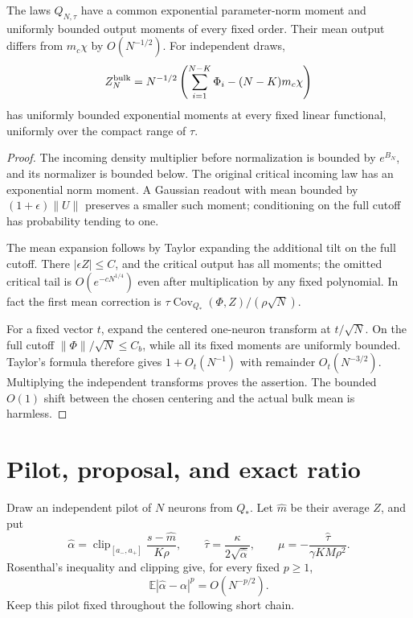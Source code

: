 \documentclass[11pt]{article}
\newcommand{\E}{\mathbb E}\newcommand{\R}{\mathbb R}
\begin{document}
\begin{lemma}\label{lem:moments}
The laws $Q_{N,\tau}$ have a common exponential parameter-norm moment
and uniformly bounded output moments of every fixed order. Their mean
output differs from $m_c\chi$ by $O(N^{-1/2})$. For independent draws,
\[
 Z_N^{\rm bulk}=N^{-1/2}\left(\sum_{i=1}^{N-K}\Phi_i-(N-K)m_c\chi\right)
\]
has uniformly bounded exponential moments at every fixed linear
functional, uniformly over the compact range of $\tau$.
\end{lemma}
\begin{proof}
The incoming density multiplier before normalization is bounded by
$e^{B_N}$, and its normalizer is bounded below. The original critical
incoming law has an exponential norm moment. A Gaussian readout with
mean bounded by $(1+\epsilon)\|U\|$ preserves a smaller such moment;
conditioning on the full cutoff has probability tending to one.

The mean expansion follows by Taylor expanding the additional tilt
on the full cutoff. There $|\epsilon Z|\le C$, and the critical output
has all moments; the omitted critical tail is $O(e^{-cN^{1/4}})$ even
after multiplication by any fixed polynomial. In fact the first mean
correction is
$\tau\operatorname{Cov}_{Q_*}(\Phi,Z)/(\rho\sqrt N)$.

For a fixed vector $t$, expand the centered one-neuron transform at
$t/\sqrt N$. On the full cutoff $\|\Phi\|/\sqrt N\le C_b$, while
all its fixed moments are uniformly bounded. Taylor's formula therefore
gives $1+O_t(N^{-1})$ with remainder $O_t(N^{-3/2})$. Multiplying the
independent transforms proves the assertion. The bounded $O(1)$ shift
between the chosen centering and the actual bulk mean is harmless.
\end{proof}

\section{Pilot, proposal, and exact ratio}
Draw an independent pilot of $N$ neurons from $Q_*$. Let $\widehat m$
be their average $Z$, and put
\[
 \widehat\alpha=\operatorname{clip}_{[a_-,a_+]}
              \frac{s-\widehat m}{K\rho},\qquad
 \widehat\tau=\frac\kappa{2\sqrt{\widehat\alpha}},\qquad
 \mu=-\frac{\widehat\tau}{\gamma KM\rho^2}.              \tag{7}
\]
Rosenthal's inequality and clipping give, for every fixed $p\ge1$,
\[
                 \E|\widehat\alpha-\alpha|^p=O(N^{-p/2}). \tag{8}
\]
Keep this pilot fixed throughout the following short chain.
\end{document}
